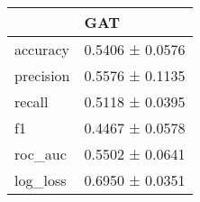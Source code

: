 \begin{tabular}{ll}
\toprule
 & GAT \\
\midrule
accuracy & 0.5406 ± 0.0576 \\
precision & 0.5576 ± 0.1135 \\
recall & 0.5118 ± 0.0395 \\
f1 & 0.4467 ± 0.0578 \\
roc_auc & 0.5502 ± 0.0641 \\
log_loss & 0.6950 ± 0.0351 \\
\bottomrule
\end{tabular}
